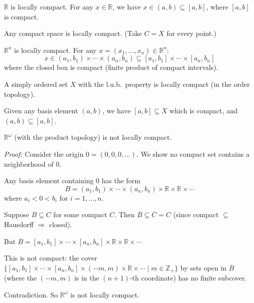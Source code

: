 \documentclass[11pt]{report}
\begin{document}
\begin{exbox}
$\mathbb{R}$ is locally compact. For any $x \in \mathbb{R}$, we have $x \in (a, b) \subseteq [a, b]$, where $[a, b]$ is compact.
\end{exbox}

\begin{exbox}
Any compact space is locally compact. (Take $C = X$ for every point.)
\end{exbox}

\begin{exbox}
$\mathbb{R}^n$ is locally compact. For any $x = (x_1, \ldots, x_n) \in \mathbb{R}^n$:
\[x \in (a_1, b_1) \times \cdots \times (a_n, b_n) \subseteq [a_1, b_1] \times \cdots \times [a_n, b_n]\]
where the closed box is compact (finite product of compact intervals).
\end{exbox}

\begin{exbox}
A simply ordered set $X$ with the l.u.b.\ property is locally compact (in the order topology).

Given any basis element $(a, b)$, we have $[a, b] \subseteq X$ which is compact, and $(a, b) \subseteq [a, b]$.
\end{exbox}

\begin{exbox}
$\mathbb{R}^\omega$ (with the product topology) is not locally compact.

\textit{Proof:} Consider the origin $0 = (0, 0, 0, \ldots)$. We show no compact set contains a neighborhood of $0$.

Any basis element containing $0$ has the form 
\[B = (a_1, b_1) \times \cdots \times (a_n, b_n) \times \mathbb{R} \times \mathbb{R} \times \cdots\]
where $a_i < 0 < b_i$ for $i = 1, \ldots, n$.

Suppose $B \subseteq C$ for some compact $C$. Then $\overline{B} \subseteq \overline{C} = C$ (since compact $\subseteq$ Hausdorff $\Rightarrow$ closed).

But $\overline{B} = [a_1, b_1] \times \cdots \times [a_n, b_n] \times \mathbb{R} \times \mathbb{R} \times \cdots$

This is not compact: the cover $\{[a_1, b_1] \times \cdots \times [a_n, b_n] \times (-m, m) \times \mathbb{R} \times \cdots \mid m \in \mathbb{Z}_+\}$ by sets open in $\overline{B}$ (where the $(-m, m)$ is in the $(n+1)$-th coordinate) has no finite subcover.

Contradiction. So $\mathbb{R}^\omega$ is not locally compact.
\end{exbox}
\end{document}
